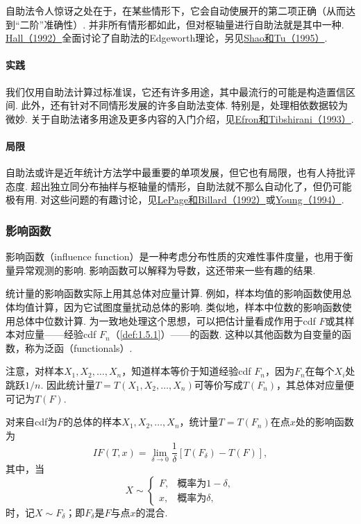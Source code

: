 自助法令人惊讶之处在于，在某些情形下，它会自动使展开的第二项正确（从而达到“二阶”准确性）. 并非所有情形都如此，但对枢轴量进行自助法就是其中一种. \hyperref[bib:source154]{Hall（1992）}全面讨论了自助法的Edgeworth理论，另见\hyperref[bib:source288]{Shao和Tu（1995）}.

\paragraph{实践}
我们仅用自助法计算过标准误，它还有许多用途，其中最流行的可能是构造置信区间. 此外，还有针对不同情形发展的许多自助法变体. 特别是，处理相依数据较为微妙. 关于自助法诸多用途及更多内容的入门介绍，见\hyperref[bib:source114]{Efron和Tibshirani（1993）}.

\paragraph{局限}
自助法或许是近年统计方法学中最重要的单项发展，但它也有局限，也有人持批评态度. 超出独立同分布抽样与枢轴量的情形，自助法就不那么自动化了，但仍可能极有用. 对这些问题的有趣讨论，见\hyperref[bib:source203]{LePage和Billard（1992）}或\hyperref[bib:source336]{Young（1994）}.

\subsubsection{影响函数}\label{sec:10.6.4}
影响函数（influence function）是一种考虑分布性质的灾难性事件度量，也用于衡量异常观测的影响. 影响函数可以解释为导数，这还带来一些有趣的结果.

统计量的影响函数实际上用其总体对应量计算. 例如，样本均值的影响函数使用总体均值计算，因为它试图度量扰动总体的影响. 类似地，样本中位数的影响函数使用总体中位数计算. 为一致地处理这个思想，可以把估计量看成作用于cdf $F$或其样本对应量——经验cdf $F_n$（\autoref{def:1.5.1}）——的函数. 这种以其他函数为自变量的函数，称为泛函（functionals）.

注意，对样本$X_1,X_2,\ldots,X_n$，知道样本等价于知道经验cdf $F_n$，因为$F_n$在每个$X_i$处跳跃$1/n$. 因此统计量$T=T(X_1,X_2,\ldots,X_n)$可等价写成$T(F_n)$，其总体对应量便可记为$T(F)$.

\begin{definition}\label{def:10.6.1}
对来自cdf为$F$的总体的样本$X_1,X_2,\ldots,X_n$，统计量$T=T(F_n)$在点$x$处的影响函数为
$$IF(T,x)=\lim_{\delta\to0}\frac1\delta[T(F_\delta)-T(F)],$$
其中，当
$$X\sim\begin{cases}F,&\text{概率为$1-\delta$},\\x,&\text{概率为$\delta$},\end{cases}$$
时，记$X\sim F_\delta$；即$F_\delta$是$F$与点$x$的混合.
\end{definition}

